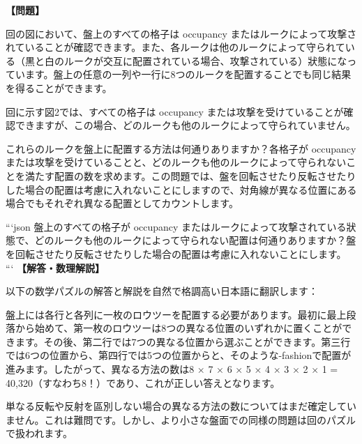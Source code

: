 \documentclass[10pt,a4paper,oneside,openany]{ltjsbook}
\begin{document}
\begin{tcolorbox}[colback=softblue,colframe=primaryblue,title=\textbf{第 295 問：THE EIGHT ROOKS.},arc=2mm,boxrule=1pt,breakable]
\textbf{【問題】}\par\vspace{0.3em}
回の図において、盤上のすべての格子は occupancy またはルークによって攻撃されていることが確認できます。また、各ルークは他のルークによって守られている（黒と白のルークが交互に配置されている場合、攻撃されている）狀態になっています。盤上の任意の一列や一行に8つのルークを配置することでも同じ結果を得ることができます。

回に示す図2では、すべての格子は occupancy または攻撃を受けていることが確認できますが、この場合、どのルークも他のルークによって守られていません。

これらのルークを盤上に配置する方法は何通りありますか？各格子が occupancy または攻撃を受けていることと、どのルークも他のルークによって守られないことを満たす配置の数を求めます。この問題では、盤を回転させたり反転させたりした場合の配置は考慮に入れないことにしますので、対角線が異なる位置にある場合でもそれぞれ異なる配置としてカウントします。

```json
盤上のすべての格子が occupancy またはルークによって攻撃されている狀態で、どのルークも他のルークによって守られない配置は何通りありますか？盤を回転させたり反転させたりした場合の配置は考慮に入れないことにします。
```
\tcblower
\textbf{【解答・数理解説】}\par\vspace{0.3em}
以下の数学パズルの解答と解説を自然で格調高い日本語に翻訳します：

盤上には各行と各列に一枚のロウツーを配置する必要があります。最初に最上段落から始めて、第一枚のロウツーは8つの異なる位置のいずれかに置くことができます。その後、第二行では7つの異なる位置から選ぶことができます。第三行では6つの位置から、第四行では5つの位置からと、そのような-fashionで配置が進みます。したがって、異なる方法の数は8 × 7 × 6 × 5 × 4 × 3 × 2 × 1 = 40,320（すなわち8！）であり、これが正しい答えとなります。

単なる反転や反射を區別しない場合の異なる方法の数についてはまだ確定していません。これは難問です。しかし、より小さな盤面での同様の問題は回のパズルで扱われます。
\end{tcolorbox}
\end{document}
